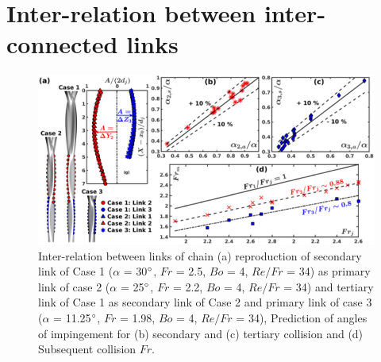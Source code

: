 \documentclass{jfm}
\begin{document}
\section{Inter-relation between inter-connected links} 
\begin{figure}
	\centering
	\includegraphics[width=\linewidth]{Figure8}
	\caption{Inter-relation between links of chain (a) reproduction of secondary link of Case 1 ($\alpha$ = 30$\degree$, $Fr$ = 2.5, $Bo$ = 4, $Re/Fr$ = 34) as primary link of case 2 ($\alpha$ = 25$\degree$, $Fr$ = 2.2, $Bo$ = 4, $Re/Fr$ = 34) and tertiary link of Case 1 as secondary link of Case 2 and primary link of case 3 ($\alpha$ = 11.25$\degree$, $Fr$ = 1.98, $Bo$ = 4, $Re/Fr$ = 34), Prediction of angles of impingement for (b) secondary and (c) tertiary collision and (d) Subsequent collision $Fr$.}
	\label{Figure::secondCollision}%
\end{figure}
\end{document}
